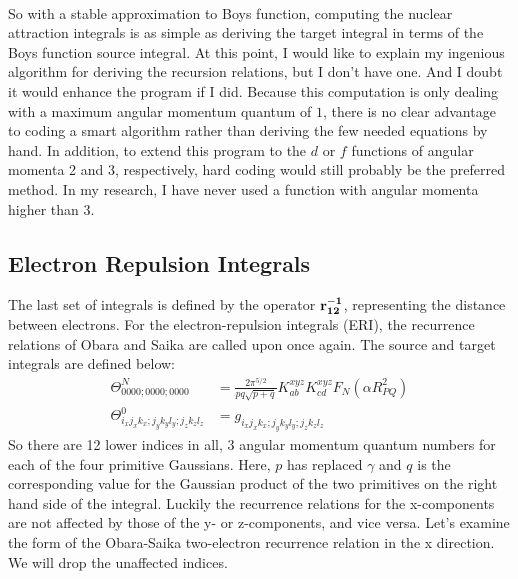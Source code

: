 \documentclass[12pt]{article}
\begin{document}
\hspace{0.85in}{\tt total+=mydict[closest]*(-1*diff)**k/factorial(k)}

\hspace{0.5in}{\tt return total}\\

\noindent
So with a stable approximation to Boys function, computing the nuclear attraction
integrals is as simple as deriving the target integral in terms of the Boys
function source integral. At this point, I would like to explain my ingenious
algorithm for deriving the recursion relations, but I don't have one.
And I doubt it would enhance the program if I did. Because this computation
is only dealing with a maximum angular momentum quantum of $1$,
there is no clear advantage to coding a smart algorithm rather than deriving
the few needed equations by hand. In addition, to extend this program to the $d$
or $f$ functions of angular momenta 2 and 3, respectively, hard coding would still
probably be the preferred method. In my research, I have never used a function
with angular momenta higher than 3.

\subsection{Electron Repulsion Integrals}
The last set of integrals is defined by the operator $\bf{r}_{12}^{-1}$, representing
the distance between electrons.
For the electron-repulsion integrals (ERI), the recurrence relations of Obara and Saika
are called upon once again. The source and target integrals are defined below:
\begin{align*}
\Theta_{0000;0000;0000}^N &=\frac{2\pi^{5/2}}{pq\sqrt{p+q}}K_{ab}^{xyz}K_{cd}^{xyz}
F_N(\alpha R_{PQ}^2) \\
\Theta_{i_x j_x k_x; j_y k_y l_y; j_z k_z l_z}^0 &= g_{i_x j_x k_x; j_y k_y l_y; j_z k_z l_z}
\end{align*}
So there are 12 lower indices in all, 3 angular momentum quantum numbers for each of the
four primitive Gaussians. Here, $p$ has replaced $\gamma$ and $q$ is the
corresponding value for the Gaussian product of the two primitives on the
right hand side of the integral. Luckily the recurrence relations for the
x-components are not affected by those of the y- or z-components, and vice versa.
Let's examine the form of the Obara-Saika two-electron recurrence relation in the
x direction. We will drop the unaffected indices.
\end{document}
